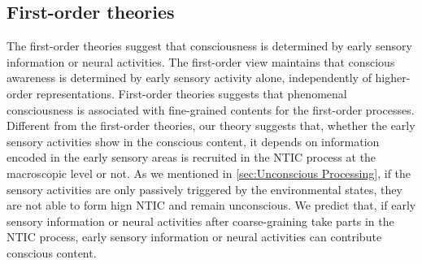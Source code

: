 \documentclass[utf8]{article}
\begin{document}
		\subsection{First-order theories}
            The first-order theories suggest that consciousness is determined by early sensory information or neural activities. The first-order view maintains that conscious awareness is determined by early sensory activity alone, independently of higher-order representations.
            First-order theories suggests that phenomenal consciousness is associated with fine-grained contents for the first-order processes. Different from the first-order theories, our theory suggests that, whether the early sensory activities show in the conscious content, it depends on information encoded in the early sensory areas is recruited in the NTIC process at the macroscopic level or not. As we mentioned in \ref{sec:Unconscious Processing}, if the sensory activities are only passively triggered by the environmental states, they are not able to form hign NTIC and remain unconscious. We predict that, if early sensory information or neural activities after coarse-graining take parts in the NTIC process, early sensory information or neural activities can contribute conscious content. 
		
\end{document}
